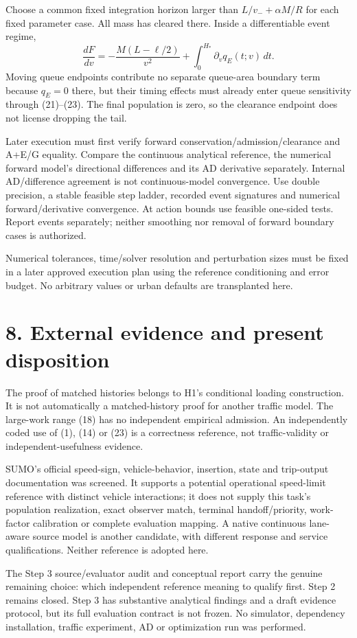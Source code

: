 \documentclass[11pt,a4paper]{article}
\begin{document}
Choose a common fixed integration horizon larger than
$L/v_-+\alpha M/R$ for each fixed parameter case. All mass has cleared there.
Inside a differentiable event regime,
\[
 \frac{dF}{dv}=-\frac{M(L-\ell/2)}{v^2}
                   +\int_0^{H_*}\partial_v q_E(t;v)\,dt.
 \tag{24}
\]
Moving queue endpoints contribute no separate queue-area boundary term
because $q_E=0$ there, but their timing effects must already enter queue
sensitivity through (21)--(23). The final population is zero, so the
clearance endpoint does not license dropping the tail.

Later execution must first verify forward conservation/admission/clearance
and A+E/G equality. Compare the continuous analytical reference, the numerical
forward model's directional differences and its AD derivative separately.
Internal AD/difference agreement is not continuous-model convergence.
Use double precision, a stable feasible step ladder, recorded event signatures
and numerical forward/derivative convergence. At action bounds use feasible
one-sided tests. Report events separately; neither smoothing nor removal of
forward boundary cases is authorized.

Numerical tolerances, time/solver resolution and perturbation sizes must be
fixed in a later approved execution plan using the reference conditioning and
error budget. No arbitrary values or urban defaults are transplanted here.

\section*{8. External evidence and present disposition}
The proof of matched histories belongs to H1's conditional loading construction.
It is not automatically a matched-history proof for another traffic model.
The large-work range (18) has no independent empirical admission.
An independently coded use of (1), (14) or (23) is a correctness reference,
not traffic-validity or independent-usefulness evidence.

SUMO's official speed-sign, vehicle-behavior, insertion, state and trip-output
documentation was screened. It supports a potential operational speed-limit
reference with distinct vehicle interactions; it does not supply this task's
population realization, exact observer match, terminal handoff/priority,
work-factor calibration or complete evaluation mapping. A native continuous
lane-aware source model is another candidate, with different response and
service qualifications. Neither reference is adopted here.

The Step 3 source/evaluator audit and conceptual report carry the genuine
remaining choice: which independent reference meaning to qualify first.
Step 2 remains closed. Step 3 has substantive analytical findings and a
draft evidence protocol, but its full evaluation contract is not frozen.
No simulator, dependency installation, traffic experiment, AD or optimization
run was performed.
\end{document}
